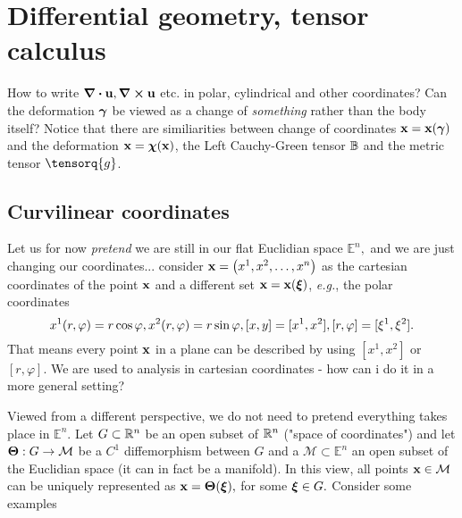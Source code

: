 \documentclass[../main.tex]{subfiles}
\begin{document}
\section{Differential geometry, tensor calculus}
\label{sec:curvilinear_coords}
How to write $\divergence{\vb{u}}, \curl{\vb{u}}$ etc. in polar, cylindrical and other coordinates? Can the deformation $\vb*{\gamma}$ be viewed as a change of \textit{something} rather than the body itself?  Notice that there are similiarities between change of coordinates $\vb{x} = \vb{x}(\vb*{\gamma})$ and the deformation $\vb{x}=\vb*{\chi}(\vb{x})$, the Left Cauchy-Green tensor $\mathbb{B}$ and the metric tensor $\tensorq{g}$.


\subsection{Curvilinear coordinates}
\label{sec:coordinates}

Let us for now \textit{pretend} we are still in our flat Euclidian space $\mathbb{E}^{n},$ and we are just changing our coordinates... consider $\vb{x}=\qty(x^1,x^2,\dots,x^n)$ as the cartesian coordinates of the point $\vb{x}$ and a different set $\vb{x}=\vb{x}(\vb*{\xi})$, \textit{e.g.}, the polar coordinates
\[
	x^1(r,\varphi)=r \cos \varphi, x^2\qty(r,\varphi)=r \sin \varphi, [x,y] = [x^1, x^2], [r,\varphi] = [\xi^1,\xi^2].
\]
That means every point $\vb{x}$ in a plane can be described by using $[x^1,x^2]$ or $[r,\varphi]$. We are used to analysis in cartesian coordinates - how can i do it in a more general setting?

Viewed from a different perspective, we do not need to pretend everything takes place in $\mathbb{E}^{n}.$ Let $G \subset {\mathbb R}^{n}$ be an open subset of ${\mathbb R}^{n}$ ("space of coordinates") and let $\vb*{\Theta}: G \to \mathcal{M}$ be a $C^1$ diffemorphism between $G$ and a $\mathcal{M} \subset \mathbb{E}^n$ an open subset of the Euclidian space (it can in fact be a manifold). In this view, all points $\vb{x} \in \mathcal{M}$ can be uniquely represented as $\vb{x} = \vb*{\Theta}\qty(\vb*{\xi}),$ for some $\vb*{\xi} \in G.$ Consider some examples
\end{document}
